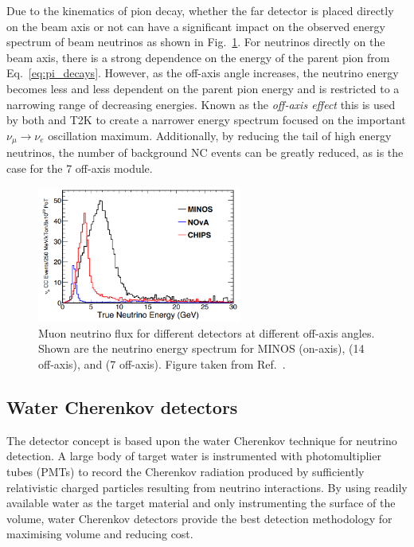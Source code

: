 Due to the kinematics of pion decay, whether the far detector is placed directly on the beam axis
or not can have a significant impact on the observed energy spectrum of beam neutrinos as shown in
Fig.~\ref{fig:numi_axis}. For neutrinos directly on the beam axis, there is a strong dependence on
the energy of the parent pion from Eq.~\ref{eq:pi_decays}. However, as the off-axis angle
increases, the neutrino energy becomes less and less dependent on the parent pion energy and is
restricted to a narrowing range of decreasing energies. Known as the \emph{off-axis effect} this
is used by both \nova and T2K to create a narrower energy spectrum focused on the important
$\nu_{\mu}\rightarrow\nu_{e}$ oscillation maximum. Additionally, by reducing the tail of high
energy neutrinos, the number of background NC events can be greatly reduced, as is the case for
the \unit{7}{} off-axis \chipsfive module.

\begin{figure} %
    \includegraphics[width=0.6\textwidth]{diagrams/4-chips/numi_axis.png}
    \caption[Muon neutrino flux for different \numi detectors at different off-axis angles]
    {Muon neutrino flux for different \numi detectors at different off-axis angles. Shown are the
        neutrino energy spectrum for MINOS (on-axis), \nova (\unit{14}{} off-axis),
        and \chipsfive (\unit{7}{} off-axis). Figure taken from
        Ref.~\cite{adamson2013}.}
    \label{fig:numi_axis}
\end{figure}

\subsection{Water Cherenkov detectors} %
\label{sec:chips_concept_cherenkov} %

The \chips detector concept is based upon the water Cherenkov technique for neutrino detection. A
large body of target water is instrumented with photomultiplier tubes (PMTs) to record the
Cherenkov radiation produced by sufficiently relativistic charged particles resulting from
neutrino interactions. By using readily available water as the target material and only
instrumenting the surface of the volume, water Cherenkov detectors provide the best detection
methodology for maximising volume and reducing cost.

